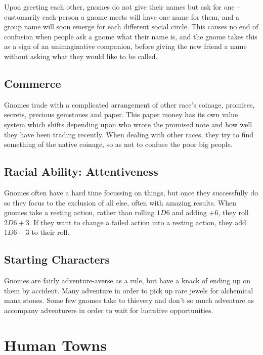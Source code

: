 \documentclass[titlepage,a4paper,openany]{book}
\begin{document}
\begin{multicols}{2}
Upon greeting each other, gnomes do not give their names but ask for one -- customarily each person a gnome meets will have one name for them, and a group name will soon emerge for each different social circle. This causes no end of confusion when people ask a gnome what their name is, and the gnome takes this as a sign of an unimaginative companion, before giving the new friend a name without asking what they would like to be called.

\subsection{Commerce}

Gnomes trade with a complicated arrangement of other race's coinage, promises, secrets, precious gemstones and paper. This paper money has its own value system which shifts depending upon who wrote the promised note and how well they have been trading recently. When dealing with other races, they try to find something of the native coinage, so as not to confuse the poor big people.

\subsection{Racial Ability: Attentiveness}
Gnomes often have a hard time focussing on things, but once they successfully do so they focus to the exclusion of all else, often with amazing results. When gnomes take a resting action, rather than rolling $1D6$ and adding +6, they roll $2D6+3$.  If they want to change a failed action into a resting action, they add $1D6-3$ to their roll.

\subsection{Starting Characters}
Gnomes are fairly adventure-averse as a rule, but have a knack of ending up on them by accident. Many adventure in order to pick up rare jewels for alchemical mana stones. Some few gnomes take to thievery and don't so much adventure as accompany adventurers in order to wait for lucrative opportunities.

\end{multicols}

\section[Humans]{Human Towns}
\end{document}
